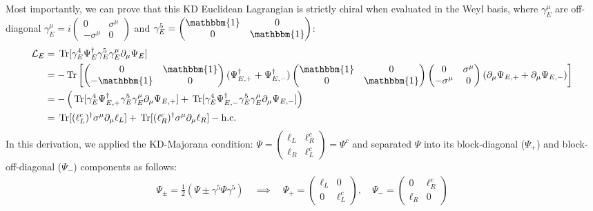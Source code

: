 Most importantly, we can prove that this KD Euclidean Lagrangian is strictly chiral when evaluated in the Weyl basis, where $\gamma_E^\mu$ are off-diagonal $\gamma_E^\mu=i\begin{pmatrix}0& \sigma^\mu\\ -\sigma^\mu & 0\end{pmatrix}$ and $\gamma_E^5=\begin{pmatrix}\mathbbm{1}& 0\\ 0 & \mathbbm{1}\end{pmatrix}$:
\begin{equation}\label{eq:Lagrangian_KD_Euclidean}
\begin{aligned}
    \mathcal{L}_E&=\,{\rm Tr}[\gamma_E^4\Psi_E^\dagger \gamma_E^5\gamma_E^\mu\partial_\mu \Psi_E]\\
    &=-\,{\rm Tr}\left[\begin{pmatrix}0& \mathbbm{1}\\ -\mathbbm{1} & 0\end{pmatrix}(\Psi_{E,+}^\dagger+\Psi_{E,-}^\dagger )\begin{pmatrix}\mathbbm{1}& 0\\ 0 & \mathbbm{1}\end{pmatrix}\begin{pmatrix}0& \sigma^\mu\\ -\sigma^\mu & 0\end{pmatrix}(\partial_\mu \Psi_{E,+}+\partial_\mu \Psi_{E,-})\right]\\
    &=-\left(\,{\rm Tr}[\gamma_E^4\Psi_{E,+}^\dagger \gamma_E^5\gamma_E^\mu\partial_\mu \Psi_{E,+}]+\,{\rm Tr}[\gamma_E^4\Psi_{E,-}^\dagger \gamma_E^5\gamma_E^\mu\partial_\mu \Psi_{E,-}]\right)\\
    &=\,{\rm Tr}[(\ell_L^c)^\dagger\sigma^\mu\partial_\mu\ell_L]+\,{\rm Tr}[(\ell_R^c)^\dagger\sigma^\mu\partial_\mu\ell_R]-\text{h.c.}
\end{aligned}
\end{equation}
In this derivation, we applied the KD-Majorana condition: 
$\Psi=\begin{pmatrix}
        \ell_L& \ell_R^c \\
        \ell_R& \ell_L^c
    \end{pmatrix}=\Psi^c$
and separated $\Psi$ into its block-diagonal ($\Psi_+$) and block-off-diagonal ($\Psi_-$) components as follows:
\begin{equation}
\begin{aligned}
   \Psi_{\pm}=\frac{1}{2}(\Psi\pm\gamma^5\Psi\gamma^5) \quad \implies \quad \Psi_+=\begin{pmatrix}
        \ell_L& 0 \\
        0& \ell_L^c
    \end{pmatrix}, \quad \Psi_-=\begin{pmatrix}
        0& \ell_R^c \\
        \ell_R& 0
    \end{pmatrix}
\end{aligned}
\end{equation}

